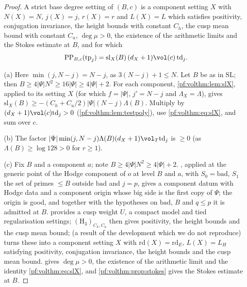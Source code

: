 \begin{proof}
A strict base degree setting of $(B,c)$ is a component setting $X$ with $N(X)=N$, $j(X)=j$, $r(X)=r$ and
$L(X)=L$ which satisfies positivity, conjugation invariance, the height bounds with constant $C_h$, the cusp mean
bound with constant $C_u$, $\deg\mu>0$, the existence of the arithmetic limits and the Stokes estimate at $B$, and
for which
\begin{equation}\label{pf:volthm:eq:slX}
\volthmPP_{B,c}(\mathrm{tp}_j)=\mathrm{sl}_X(B)\,(d_X+1)\vol(c)\,\mathrm{td}_j .
\end{equation}

(a) Here $\min(j,N-j)=N-j$, as $3(N-j)+1\le N$. Let $B$ be as in $\mathrm{SL}$; then
$B\ge4|\Psi|N^2\ge16|\Psi|\ge4|\Psi|+2$. For each component, \cref{pf:volthm:lem:slX}, applied to its setting $X$
(for which $f=|\Psi|$, $j'=N-j$ and $\Lambda_X=\Lambda$), gives $\mathrm{sl}_X(B)\ge-(C_h+C_u/2)|\Psi|(N-j)\Lambda(B)$.
Multiply by $(d_X+1)\vol(c)\mathrm{td}_j>0$
(\cref{pf:volthm:lem:testpoly}), use \eqref{pf:volthm:eq:slX}, and sum over $c$.

(b) The factor $|\Psi|\min(j,N-j)\Lambda(B)(d_X+1)\vol_T\mathrm{td}_j$ is $\ge0$ (as $\Lambda(B)\ge\log128>0$ for
$r\ge1$).

(c) Fix $B$ and a component $a$; note $B\ge4|\Psi|N^2\ge4|\Psi|+2$. , applied at the
generic point of the Hodge component of $o$ at level $B$ and $a$, with $S_0=\mathrm{bad}$, $S_1$ the set of primes
$\le B$ outside $\mathrm{bad}$ and $j=p$, gives a component datum with Hodge data and a component origin whose big side
is the first copy of $\Psi$; the origin is good, and together with the hypotheses on $\mathrm{bad}$, $B$ and $q\le p$
it is admitted at $B$.  provides a cusp weight $U$, a compact model and tied
regularisation settings; $(\mathrm{H}_3)_{C_h,C_u}$ then gives positivity, the height bounds and the cusp mean bound;
 (a result of the development which we do not reproduce)
turns these into a component setting $X$ with $\mathrm{rd}(X)=\mathrm{rd}_E$, $L(X)=L_H$ satisfying positivity,
conjugation invariance, the height bounds and the cusp mean bound.  gives
$\deg\mu>0$, the existence of the arithmetic limit and the identity \eqref{pf:volthm:eq:slX}, and
\cref{pf:volthm:prop:stokes} gives the Stokes estimate at $B$.
\end{proof}

